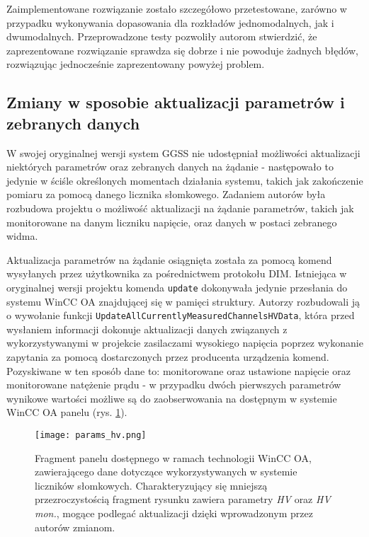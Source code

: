 Zaimplementowane rozwiązanie zostało szczegółowo przetestowane, zarówno w przypadku wykonywania dopasowania dla rozkładów jednomodalnych, jak i dwumodalnych. Przeprowadzone testy pozwoliły autorom stwierdzić, że zaprezentowane rozwiązanie sprawdza się dobrze i nie powoduje żadnych błędów, rozwiązując jednocześnie zaprezentowany powyżej problem.


\clearpage
\subsection{Zmiany w sposobie aktualizacji parametrów i zebranych danych}
W swojej oryginalnej wersji system GGSS nie udostępniał możliwości aktualizacji niektórych parametrów oraz zebranych danych na żądanie - następowało to jedynie w ściśle określonych momentach działania systemu, takich jak zakończenie pomiaru za pomocą danego licznika słomkowego. Zadaniem autorów była rozbudowa projektu o możliwość aktualizacji na żądanie parametrów, takich jak monitorowane na danym liczniku napięcie, oraz danych w postaci zebranego widma.

Aktualizacja parametrów na żądanie osiągnięta została za pomocą komend wysyłanych przez użytkownika za pośrednictwem protokołu DIM. Istniejąca w oryginalnej wersji projektu komenda \lstinline{update} dokonywała jedynie przesłania do systemu WinCC OA znajdującej się w pamięci struktury. Autorzy rozbudowali ją o wywołanie funkcji \lstinline{UpdateAllCurrentlyMeasuredChannelsHVData}, która przed wysłaniem informacji dokonuje aktualizacji danych związanych z wykorzystywanymi w projekcie zasilaczami wysokiego napięcia poprzez wykonanie zapytania za pomocą dostarczonych przez producenta urządzenia komend. Pozyskiwane w ten sposób dane to: monitorowane oraz ustawione napięcie oraz monitorowane natężenie prądu - w przypadku dwóch pierwszych parametrów wynikowe wartości możliwe są do zaobserwowania na dostępnym w systemie WinCC OA panelu (rys. \ref{fig:hv_params}).

\begin{figure}[H]
\centering
\texttt{[image: params\_hv.png]}
\caption{Fragment panelu dostępnego w ramach technologii WinCC OA, zawierającego dane dotyczące wykorzystywanych w systemie liczników słomkowych. Charakteryzujący się mniejszą przezroczystością fragment rysunku zawiera parametry \emph{HV} oraz \emph{HV mon.}, mogące podlegać aktualizacji dzięki wprowadzonym przez autorów zmianom.}
\label{fig:hv_params}
\end{figure}

